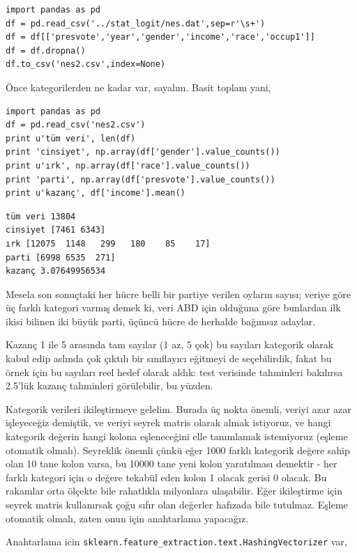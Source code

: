 \documentclass[12pt,fleqn]{article}\usepackage{../../common}
\begin{document}
\begin{verbatim}
import pandas as pd
df = pd.read_csv('../stat_logit/nes.dat',sep=r'\s+')
df = df[['presvote','year','gender','income','race','occup1']]
df = df.dropna()
df.to_csv('nes2.csv',index=None)
\end{verbatim}

Önce kategorilerden ne kadar var, sayalım. Basit toplam yani,

\begin{verbatim}
import pandas as pd
df = pd.read_csv('nes2.csv')
print u'tüm veri', len(df)
print 'cinsiyet', np.array(df['gender'].value_counts())
print u'ırk', np.array(df['race'].value_counts())
print 'parti', np.array(df['presvote'].value_counts())
print u'kazanç', df['income'].mean()
\end{verbatim}

\begin{verbatim}
tüm veri 13804
cinsiyet [7461 6343]
ırk [12075  1148   299   180    85    17]
parti [6998 6535  271]
kazanç 3.07649956534
\end{verbatim}

Mesela son sonuçtaki her hücre belli bir partiye verilen oyların sayısı;
veriye göre üç farklı kategori varmış demek ki, veri ABD için olduğuna göre
bunlardan ilk ikisi bilinen iki büyük parti, üçüncü hücre de herhalde
bağımsız adaylar. 

Kazanç 1 ile 5 arasında tam sayılar (1 az, 5 çok) bu sayıları kategorik
olarak kabul edip aslında çok çıktılı bir sınıflayıcı eğitmeyi de
seçebilirdik, fakat bu örnek için bu sayıları reel hedef olarak aldık: test
verisinde tahminleri bakılırsa 2.5'lük kazanç tahminleri görülebilir, bu
yüzden.

Kategorik verileri ikileştirmeye gelelim. Burada üç nokta önemli, veriyi
azar azar işleyeceğiz demiştik, ve veriyi seyrek matris olarak almak
istiyoruz, ve hangi kategorik değerin hangi kolona eşleneceğini elle
tanımlamak istemiyoruz (eşleme otomatik olmalı). Seyreklik önemli çünkü
eğer 1000 farklı kategorik değere sahip olan 10 tane kolon varsa, bu 10000
tane yeni kolon yaratılması demektir - her farklı kategori için o değere
tekabül eden kolon 1 olacak gerisi 0 olacak. Bu rakamlar orta ölçekte bile
rahatlıkla milyonlara ulaşabilir. Eğer ikileştirme için seyrek matris
kullanırsak çoğu sıfır olan değerler hafızada bile tutulmaz. Eşleme
otomatik olmalı, zaten onun için anahtarlama yapacağız.

Anahtarlama icin \verb!sklearn.feature_extraction.text.HashingVectorizer!
var,
\end{document}

